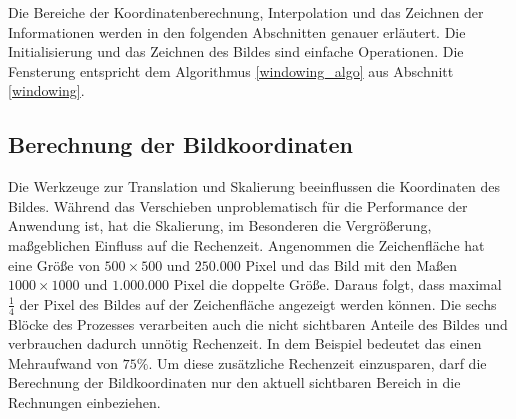 Die Bereiche der Koordinatenberechnung, Interpolation und das Zeichnen der Informationen werden in den folgenden Abschnitten genauer erläutert. Die Initialisierung und das Zeichnen des Bildes sind einfache Operationen. Die Fensterung entspricht dem Algorithmus \ref{windowing_algo} aus Abschnitt \ref{windowing}.

\subsection{Berechnung der Bildkoordinaten}
Die Werkzeuge zur Translation und Skalierung beeinflussen die Koordinaten des Bildes. Während das Verschieben unproblematisch für die Performance der Anwendung ist, hat die Skalierung, im Besonderen die Vergrößerung, maßgeblichen Einfluss auf die Rechenzeit. Angenommen die Zeichenfläche hat eine Größe von $500 \times 500$ und $250.000$ Pixel und das Bild mit den Maßen $1000 \times 1000$  und $1.000.000$ Pixel die doppelte Größe. Daraus folgt, dass maximal $\frac{1}{4}$ der Pixel des Bildes auf der Zeichenfläche angezeigt werden können. Die sechs Blöcke des Prozesses verarbeiten auch die nicht sichtbaren Anteile des Bildes und verbrauchen dadurch unnötig Rechenzeit. In dem Beispiel bedeutet das einen Mehraufwand von $75\%$. Um diese zusätzliche Rechenzeit einzusparen, darf die Berechnung der Bildkoordinaten nur den aktuell sichtbaren Bereich in die Rechnungen einbeziehen.\\

